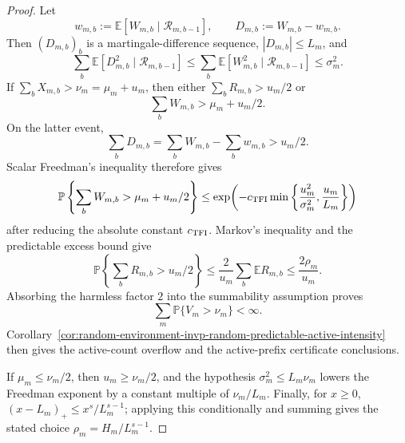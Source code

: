 \documentclass[11pt]{amsart}
\numberwithin{equation}{section}
\theoremstyle{definition}
\theoremstyle{remark}
\newcommand{\Prob}{\mathbb P}
\newcommand{\Exp}{\mathbb E}
\begin{document}
\begin{proof}
Let
\[
  w_{m,b}:=\Exp[W_{m,b}\mid\mathcal R_{m,b-1}],
  \qquad
  D_{m,b}:=W_{m,b}-w_{m,b}.
\]
Then \((D_{m,b})_b\) is a martingale-difference sequence, \(|D_{m,b}|\le L_m\),
and
\[
  \sum_b\Exp[D_{m,b}^2\mid\mathcal R_{m,b-1}]
  \le
  \sum_b\Exp[W_{m,b}^2\mid\mathcal R_{m,b-1}]
  \le \sigma_m^2 .
\]
If \(\sum_bX_{m,b}>\nu_m=\mu_m+u_m\), then either
\(\sum_bR_{m,b}>u_m/2\) or
\[
  \sum_b W_{m,b}>\mu_m+u_m/2 .
\]
On the latter event,
\[
  \sum_bD_{m,b}
  =
  \sum_bW_{m,b}-\sum_bw_{m,b}
  >
  u_m/2 .
\]
Scalar Freedman's inequality therefore gives
\[
  \Prob\left\{\sum_bW_{m,b}>\mu_m+u_m/2\right\}
  \le
  \exp\!\left(
    -c_{\rm TFI}\min\left\{\frac{u_m^2}{\sigma_m^2},
                          \frac{u_m}{L_m}\right\}
  \right)
\]
after reducing the absolute constant \(c_{\rm TFI}\).  Markov's inequality and
the predictable excess bound give
\[
  \Prob\left\{\sum_bR_{m,b}>u_m/2\right\}
  \le
  \frac{2}{u_m}\sum_b\Exp R_{m,b}
  \le \frac{2\rho_m}{u_m}.
\]
Absorbing the harmless factor \(2\) into the summability assumption proves
\[
  \sum_m\Prob\{V_m>\nu_m\}<\infty .
\]
Corollary~\ref{cor:random-environment-invp-random-predictable-active-intensity}
then gives the active-count overflow and the active-prefix certificate
conclusions.

If \(\mu_m\le\nu_m/2\), then \(u_m\ge\nu_m/2\), and the hypothesis
\(\sigma_m^2\le L_m\nu_m\) lowers the Freedman exponent by a constant multiple
of \(\nu_m/L_m\).  Finally, for \(x\ge0\),
\((x-L_m)_+\le x^s/L_m^{s-1}\); applying this conditionally and summing gives
the stated choice \(\rho_m=H_m/L_m^{s-1}\).
\end{proof}
\end{document}
